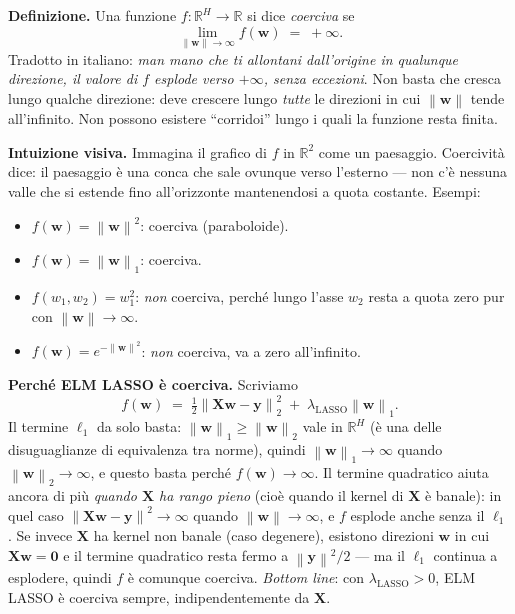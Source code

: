 \documentclass[11pt,a4paper]{article}
\newcommand{\R}{\mathbb{R}}
\newcommand{\norm}[1]{\left\|#1\right\|}
\newcommand{\bw}{\mathbf{w}}
\newcommand{\by}{\mathbf{y}}
\newcommand{\bX}{\mathbf{X}}
\newcommand{\bzero}{\mathbf{0}}
\theoremstyle{definition}
\begin{document}
\begin{tcolorbox}[intuition,title=Cosa significa ``coerciva'' (per ELM LASSO, in concreto)]
\textbf{Definizione.} Una funzione $f : \R^H \to \R$ si dice \emph{coerciva} se
\[
\lim_{\norm{\bw}\to\infty} f(\bw) \;=\; +\infty.
\]
Tradotto in italiano: \emph{man mano che ti allontani dall'origine in qualunque direzione, il valore di $f$ esplode verso $+\infty$, senza eccezioni}. Non basta che cresca lungo qualche direzione: deve crescere lungo \emph{tutte} le direzioni in cui $\norm{\bw}$ tende all'infinito. Non possono esistere ``corridoi'' lungo i quali la funzione resta finita.

\textbf{Intuizione visiva.} Immagina il grafico di $f$ in $\R^2$ come un paesaggio. Coercività dice: il paesaggio è una conca che sale ovunque verso l'esterno --- non c'è nessuna valle che si estende fino all'orizzonte mantenendosi a quota costante. Esempi:
\begin{itemize}[leftmargin=*]
\item $f(\bw) = \norm{\bw}^2$: coerciva (paraboloide).
\item $f(\bw) = \norm{\bw}_1$: coerciva.
\item $f(w_1, w_2) = w_1^2$: \emph{non} coerciva, perché lungo l'asse $w_2$ resta a quota zero pur con $\norm{\bw}\to\infty$.
\item $f(\bw) = e^{-\norm{\bw}^2}$: \emph{non} coerciva, va a zero all'infinito.
\end{itemize}

\textbf{Perché ELM LASSO è coerciva.} Scriviamo
\[
f(\bw) \;=\; \tfrac{1}{2}\norm{\bX\bw - \by}_2^2 \;+\; \lambda_{\mathrm{LASSO}}\norm{\bw}_1.
\]
Il termine $\ell_1$ da solo basta: $\norm{\bw}_1 \ge \norm{\bw}_2$ vale in $\R^H$ (è una delle disuguaglianze di equivalenza tra norme), quindi $\norm{\bw}_1 \to \infty$ quando $\norm{\bw}_2 \to \infty$, e questo basta perché $f(\bw) \to \infty$. Il termine quadratico aiuta ancora di più \emph{quando $\bX$ ha rango pieno} (cioè quando il kernel di $\bX$ è banale): in quel caso $\norm{\bX\bw - \by}^2 \to \infty$ quando $\norm{\bw}\to\infty$, e $f$ esplode anche senza il $\ell_1$. Se invece $\bX$ ha kernel non banale (caso degenere), esistono direzioni $\bw$ in cui $\bX\bw = \bzero$ e il termine quadratico resta fermo a $\norm{\by}^2/2$ --- ma il $\ell_1$ continua a esplodere, quindi $f$ è comunque coerciva. \emph{Bottom line}: con $\lambda_{\mathrm{LASSO}} > 0$, ELM LASSO è coerciva sempre, indipendentemente da $\bX$.


\end{tcolorbox}
\end{document}

